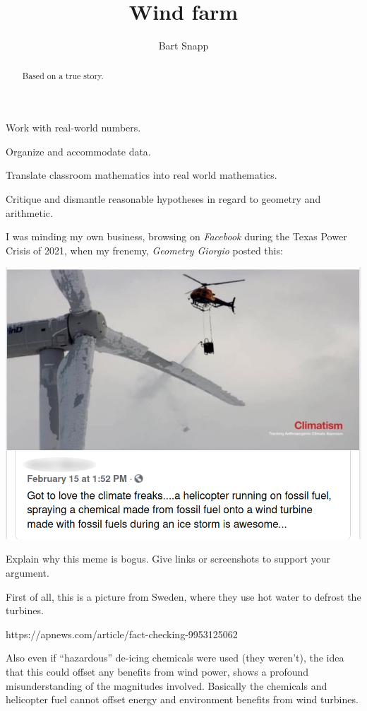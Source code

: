 \documentclass[handout,nooutcomes,noauthor]{ximera}
\title{Wind farm}
\author{Bart Snapp}
\begin{document}
\begin{abstract}
  Based on a true story.
\end{abstract}
\maketitle


\begin{listOutcomes}
\item Work with real-world numbers.
\item Organize and accommodate data.
\item Translate classroom mathematics into real world mathematics. 
\item Critique and dismantle reasonable hypotheses in regard to
  geometry and arithmetic.
\end{listOutcomes}

I was minding my own business, browsing on \textsl{Facebook} during
the Texas Power Crisis of 2021, when my frenemy, \textit{Geometry
  Giorgio} posted this:
\begin{center}
  \includegraphics[width=.6\textwidth]{meme.png}
\end{center}



\mynewpage



\begin{question}
  Explain why this meme is bogus. Give links or screenshots to support
  your argument.
  \begin{freeResponse}
    First of all, this is a picture from Sweden, where they use hot
    water to defrost the turbines.
    \begin{center}
      https://apnews.com/article/fact-checking-9953125062
    \end{center}
    Also even if ``hazardous'' de-icing chemicals were used (they
    weren't), the idea that this could offset any benefits from wind
    power, shows a profound misunderstanding of the magnitudes
    involved.  Basically the chemicals and helicopter fuel cannot
    offset energy and environment benefits from wind turbines.
  \end{freeResponse}
\end{question}
\mynewpage
\end{document}
